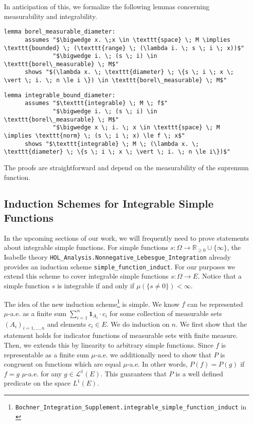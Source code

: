 In anticipation of this, we formalize the following lemmas concerning measurability and integrability.

\begin{isalemma}
{\small
	\begin{lstlisting}[style=isabelle]
	lemma borel_measurable_diameter: 
	  assumes "$\bigwedge x. \;x \in \texttt{space} \; M \implies \texttt{bounded} \; (\texttt{range} \; (\lambda i. \; s \; i \; x))$"
			  "$\bigwedge i. \; (s \; i) \in \texttt{borel\_measurable} \; M$"
	  shows "$(\lambda x. \; \texttt{diameter} \; \{s \; i \; x \; \vert \; i. \; n \le i \}) \in \texttt{borel\_measurable} \; M$"
  	\end{lstlisting}
}
\end{isalemma}

\begin{isalemma}
{\small
	\begin{lstlisting}[style=isabelle]
	lemma integrable_bound_diameter: 
	  assumes "$\texttt{integrable} \; M \; f$" 
			  "$\bigwedge i. \; (s \; i) \in \texttt{borel\_measurable} \; M$"
			  "$\bigwedge x \; i. \; x \in \texttt{space} \; M \implies \texttt{norm} \; (s \; i \; x) \le f \; x$"
	  shows "$\texttt{integrable} \; M \; (\lambda x. \; \texttt{diameter} \; \{s \; i \; x \; \vert \; i. \; n \le i\})$"
  	\end{lstlisting}
}
\end{isalemma}

The proofs are straightforward and depend on the measurability of the supremum function.

\subsection{Induction Schemes for Integrable Simple Functions}

In the upcoming sections of our work, we will frequently need to prove statements about integrable simple functions. For simple functions $s : \Omega \rightarrow \mathbb{R}_{\ge 0} \cup \{\infty\}$, the Isabelle theory \texttt{HOL\_Analysis.Nonnegative\_Lebesgue\_Integration} already provides an induction scheme \texttt{simple\_function\_induct}. For our purposes we extend this scheme to cover integrable simple functions $s : \Omega \rightarrow E$. Notice that a simple function $s$ is integrable if and only if $\mu(\{s \neq 0\}) < \infty$.

The idea of the new induction scheme\footnote{\texttt{Bochner\_Integration\_Supplement.integrable\_simple\_function\_induct} in \cite{Keskin_A_Formalization_of_2023}} is simple. We know $f$ can be represented $\mu$-a.e. as a finite sum $\sum_{i=1}^n \mathbf{1}_{A_i} \cdot c_i$  for some collection of measurable sets $(A_i)_{i=1,\dots,n}$ and elements $c_i \in E$. We do induction on $n$. We first show that the statement holds for indicator functions of measurable sets with finite measure. Then, we extends this by linearity to arbitrary simple functions. Since $f$ is representable as a finite sum $\mu$-a.e. we additionally need to show that $P$ is congruent on functions which are equal $\mu$-a.e. In other words, $P(f) = P(g)$ if $f = g$ $\mu$-a.e. for any $g \in \mathcal{L}^1(E)$. This guarantees that $P$ is a well defined predicate on the space $L^1(E)$.

